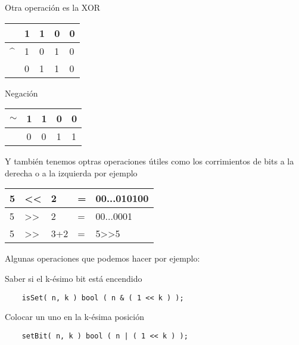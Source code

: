 Otra operación es la XOR 
\begin{longtable}[c]{lllll}
    \rowcolor[HTML]{FFFFFF} 
                                              & 1                        & 1                        & 0 & 0 \\
    \endfirsthead
    \endhead
    \rowcolor[HTML]{FFFFFF} 
    {\color[HTML]{333333} \textasciicircum{}} & {\color[HTML]{333333} 1} & {\color[HTML]{333333} 0} & 1 & 0 \\
    \rowcolor[HTML]{C0C0C0} 
                                              & 0                        & 1                        & 1 & 0
\end{longtable}

Negación 

\begin{longtable}[c]{lllll}
    \rowcolor[HTML]{FFFFFF} 
    $\sim$                  & 1                        & 1                        & 0 & 0 \\
    \endfirsthead
    \endhead
    \rowcolor[HTML]{C0C0C0} 
    {\color[HTML]{333333} } & {\color[HTML]{333333} 0} & {\color[HTML]{333333} 0} & 1 & 1
\end{longtable}

Y también tenemos optras operaciones útiles como los corrimientos de bits a la derecha o a la izquierda por ejemplo

\begin{longtable}[c]{lllll}
    \rowcolor[HTML]{FFFFFF} 
    5                        & \textless{}\textless{}                              & 2                        & = & 00...010100                    \\
    \endfirsthead
    \endhead
    \rowcolor[HTML]{FFFFFF} 
    {\color[HTML]{333333} 5} & {\color[HTML]{333333} \textgreater{}\textgreater{}} & {\color[HTML]{333333} 2} & = & 00...0001                      \\
    5                        & \textgreater{}\textgreater{}                        & 3+2                      & = & 5\textgreater{}\textgreater{}5
\end{longtable}

Algunas operaciones que podemos hacer por ejemplo: \break 

Saber si el k-ésimo bit está encendido 
\begin{lstlisting}
    isSet( n, k ) bool ( n & ( 1 << k ) );
\end{lstlisting}

Colocar un uno en la k-ésima posición
\begin{lstlisting}
    setBit( n, k ) bool ( n | ( 1 << k ) );
\end{lstlisting}

